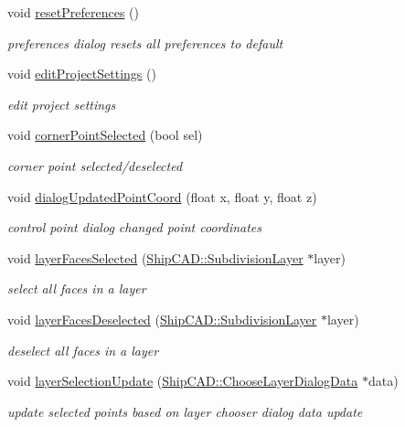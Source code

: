 \begin{DoxyCompactItemize}
void \hyperlink{classShipCAD_1_1Controller_a1cb2acde5294656b3022d3e2029427e6}{reset\+Preferences} ()
\begin{DoxyCompactList}\small\item\em preferences dialog resets all preferences to default \end{DoxyCompactList}\item 
void \hyperlink{classShipCAD_1_1Controller_a8792a506f5468a07a3ee6e7fc886b5ee}{edit\+Project\+Settings} ()
\begin{DoxyCompactList}\small\item\em edit project settings \end{DoxyCompactList}\item 
void \hyperlink{classShipCAD_1_1Controller_a5b83cea66e4de67cd7fd11df307b948d}{corner\+Point\+Selected} (bool sel)
\begin{DoxyCompactList}\small\item\em corner point selected/deselected \end{DoxyCompactList}\item 
void \hyperlink{classShipCAD_1_1Controller_a36de0343e95626e62e9683bcfc47a1ee}{dialog\+Updated\+Point\+Coord} (float x, float y, float z)
\begin{DoxyCompactList}\small\item\em control point dialog changed point coordinates \end{DoxyCompactList}\item 
void \hyperlink{classShipCAD_1_1Controller_aa3a7f9085a4bce34e7c28c222d61f9dc}{layer\+Faces\+Selected} (\hyperlink{classShipCAD_1_1SubdivisionLayer}{Ship\+C\+A\+D\+::\+Subdivision\+Layer} $\ast$layer)
\begin{DoxyCompactList}\small\item\em select all faces in a layer \end{DoxyCompactList}\item 
void \hyperlink{classShipCAD_1_1Controller_a7b18227e677079cd9bee6f5b159060b3}{layer\+Faces\+Deselected} (\hyperlink{classShipCAD_1_1SubdivisionLayer}{Ship\+C\+A\+D\+::\+Subdivision\+Layer} $\ast$layer)
\begin{DoxyCompactList}\small\item\em deselect all faces in a layer \end{DoxyCompactList}\item 
void \hyperlink{classShipCAD_1_1Controller_a672a7b2ed453cb316568217353dce1da}{layer\+Selection\+Update} (\hyperlink{structShipCAD_1_1ChooseLayerDialogData}{Ship\+C\+A\+D\+::\+Choose\+Layer\+Dialog\+Data} $\ast$data)
\begin{DoxyCompactList}\small\item\em update selected points based on layer chooser dialog data update \end{DoxyCompactList}\end{DoxyCompactItemize}
